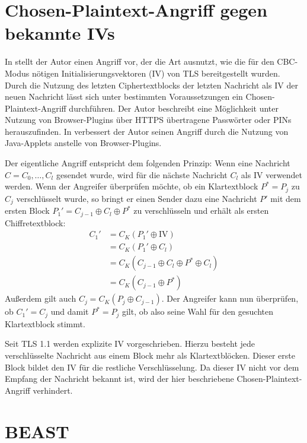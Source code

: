 \section{Chosen-Plaintext-Angriff gegen bekannte IVs}
\label{sec_known_ivs}

In \cite{bard04} stellt der Autor einen Angriff vor, der die Art ausnutzt, wie die für den CBC-Modus nötigen Initialisierungsvektoren (IV) von TLS bereitgestellt wurden. Durch die Nutzung des letzten Ciphertextblocks der letzten Nachricht als IV der neuen Nachricht lässt sich unter bestimmten Voraussetzungen ein Chosen-Plaintext-Angriff durchführen. Der Autor beschreibt eine Möglichkeit unter Nutzung von Browser-Plugins über HTTPS übertragene Passwörter oder PINs herauszufinden. In \cite{bard06} verbessert der Autor seinen Angriff durch die Nutzung von Java-Applets anstelle von Browser-Plugins.

Der eigentliche Angriff entspricht dem folgenden Prinzip: Wenn eine Nachricht \(C = C_0,\dots,C_l\) gesendet wurde, wird für die nächste Nachricht \(C_l\) als IV verwendet werden. Wenn der Angreifer überprüfen möchte, ob ein Klartextblock \(P^*=P_j\) zu \(C_j\) verschlüsselt wurde, so bringt er einen Sender dazu eine Nachricht \(P'\) mit dem ersten Block \(P_1'=C_{j-1} \oplus C_l \oplus P^*\) zu verschlüsseln und erhält als ersten Chiffretextblock:
\begin{align*}
C_1' &= C_{K}(P_1' \oplus \text{IV})\\
	&= C_{K}(P_1' \oplus C_l)\\
	&= C_{K}(C_{j-1} \oplus C_l \oplus P^* \oplus C_l)\\
	&= C_{K}(C_{j-1} \oplus P^*)
\end{align*}
Außerdem gilt auch \(C_j= C_{K}(P_j \oplus C_{j-1})\). Der Angreifer kann nun überprüfen, ob \(C_1'=C_j\) und damit \(P^*=P_j\) gilt, ob also seine Wahl für den gesuchten Klartextblock stimmt.

Seit TLS 1.1 werden explizite IV vorgeschrieben. Hierzu besteht jede verschlüsselte Nachricht aus einem Block mehr als Klartextblöcken. Dieser erste Block bildet den IV für die restliche Verschlüsselung. Da dieser IV nicht vor dem Empfang der Nachricht bekannt ist, wird der hier beschriebene Chosen-Plaintext-Angriff verhindert.

\section{BEAST}
\label{sec_attack_beast}

